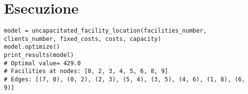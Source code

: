 \documentclass[\main/main.tex]{subfiles}
\begin{document}
\section{Esecuzione}
\begin{verbatim}
model = uncapacitated_facility_location(facilities_number, clients_number, fixed_costs, costs, capacity)
model.optimize()
print_results(model)
# Optimal value= 429.0
# Facilities at nodes: [0, 2, 3, 4, 5, 6, 8, 9]
# Edges: [(7, 0), (0, 2), (2, 3), (5, 4), (3, 5), (4, 6), (1, 8), (6, 9)]
\end{verbatim}
\end{document}
